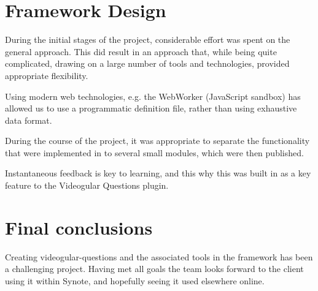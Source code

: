 

\section{Framework Design}


During the initial stages of the project, considerable effort was spent on the
general approach. This did result in an approach that, while being quite
complicated, drawing on a large number of tools and technologies, provided
appropriate flexibility.

Using modern web technologies, e.g. the WebWorker (JavaScript sandbox) has
allowed us to use a programmatic definition file, rather than using exhaustive
data format.

During the course of the project, it was appropriate to separate the
functionality that were implemented in to several small modules, which were
then published.

Instantaneous feedback is key to learning, and this why this was built in as a
key feature to the Videogular Questions plugin.

\section{Final conclusions}

Creating videogular-questions and the associated tools in the framework has been a challenging project. Having met all goals the team looks forward to the client using it within Synote, and hopefully seeing it used elsewhere online. 

